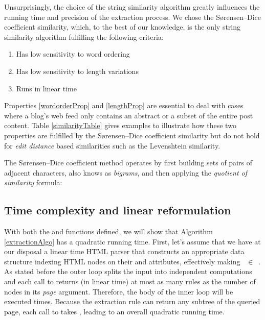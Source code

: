 \allrulesAlgo

Unsurprisingly, the choice of the string similarity algorithm greatly influences the running time and precision of the extraction process. We chose the Sørensen–Dice coefficient similarity\cite{dice1945}, which, to the best of our knowledge, is the only string similarity algorithm fulfilling the following criteria:

\begin{enumerate}
  \item\label{wordorderProp} Has low sensitivity to word ordering
  \item\label{lengthProp} Has low sensitivity to length variations
  \item\label{linearProp} Runs in linear time
\end{enumerate}

Properties \ref{wordorderProp} and \ref{lengthProp} are essential to deal with cases where a blog's web feed only contains an abstract or a subset of the entire post content. Table \ref{similarityTable} gives examples to illustrate how these two properties are fulfilled by the Sørensen–Dice coefficient similarity but do not hold for \emph{edit distance} based similarities such as the Levenshtein\cite{levenshtein1966} similarity.

\similarityTable

The Sørensen–Dice coefficient method operates by first building sets of pairs of adjacent characters, also knows as \emph{bigrams}, and then applying the \emph{quotient of similarity} formula:

\similarityAlgo


\subsection{Time complexity and linear reformulation}
\label{timecomplexityandlinearreformulation}

With both the  and  functions defined, we will show that Algorithm \ref{extractionAlgo} has a quadratic running time. First, let's assume that we have at our disposal a linear time HTML parser that constructs an appropriate data structure indexing HTML nodes on their  and  attributes, effectively making ~$\in$~. As stated before the outer loop splits the input into independent computations and each call to  returns (in linear time) at most as many rules as the number of nodes in its \emph{page} argument. Therefore, the body of the inner loop will be executed  times. Because the extraction rule can return any subtree of the queried page, each call to  takes , leading to an overall quadratic running time.

